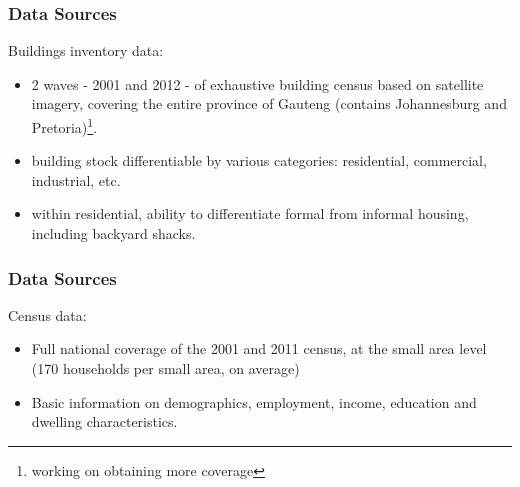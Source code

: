 \documentclass[aspectratio=149]{beamer}
\begin{document}
\begin{frame}
\frametitle{Data Sources}
Buildings inventory data:
\vspace{2mm}
  \begin{itemize}
    \item 2 waves - 2001 and 2012 - of exhaustive building census based on satellite imagery, covering the entire province of Gauteng (contains Johannesburg and Pretoria)\footnote{ working on obtaining more coverage}.
    \vspace{2mm}
    \item building stock differentiable by various categories: residential, commercial, industrial, etc.
    \vspace{2mm}
    \item within residential, ability to differentiate formal from informal housing, including backyard shacks.
\end{itemize}
\end{frame}

\begin{frame}
\frametitle{Data Sources}
Census data:
\vspace{2mm}
  \begin{itemize}
    \item Full national coverage of the 2001 and 2011 census, at the small area level (170 households per small area, on average)
    \vspace{2mm}
    \item  Basic information on demographics, employment, income, education and dwelling characteristics.

\end{itemize}
\end{frame}


\end{document}
